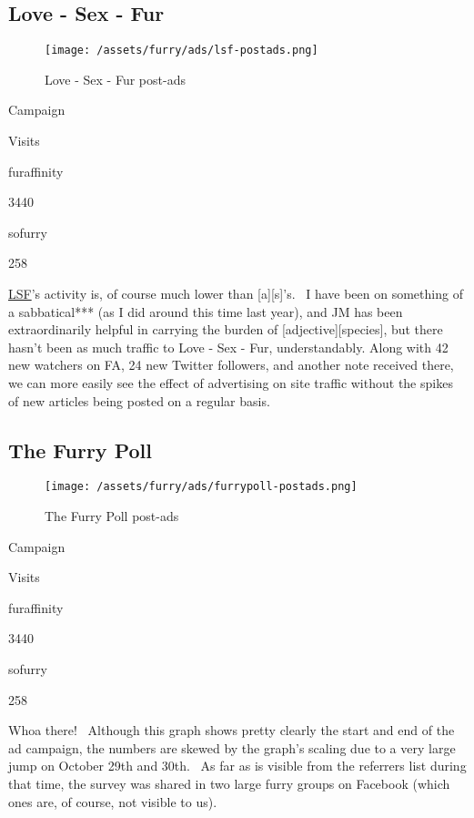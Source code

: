\subsection{Love - Sex - Fur}\label{love---sex---fur}

\begin{figure}[htbp]
\centering
\texttt{[image: /assets/furry/ads/lsf-postads.png]}
\caption{Love - Sex - Fur post-ads}
\end{figure}

Campaign

Visits

furaffinity

3440

sofurry

258

\href{http://lovesexfur.com}{LSF}'s activity is, of course much lower
than {[}a{]}{[}s{]}'s. ~I have been on something of a sabbatical*** (as
I did around this time last year), and JM has been extraordinarily
helpful in carrying the burden of {[}adjective{]}{[}species{]}, but
there hasn't been as much traffic to Love - Sex - Fur, understandably.
Along with 42 new watchers on FA, 24 new Twitter followers, and another
note received there, we can more easily see the effect of advertising on
site traffic without the spikes of new articles being posted on a
regular basis.

\subsection{The Furry Poll}\label{the-furry-poll}

\begin{figure}[htbp]
\centering
\texttt{[image: /assets/furry/ads/furrypoll-postads.png]}
\caption{The Furry Poll post-ads}
\end{figure}

Campaign

Visits

furaffinity

3440

sofurry

258

Whoa there! ~Although this graph shows pretty clearly the start and end
of the ad campaign, the numbers are skewed by the graph's scaling due to
a very large jump on October 29th and 30th. ~As far as is visible from
the referrers list during that time, the survey was shared in two large
furry groups on Facebook (which ones are, of course, not visible to us).

